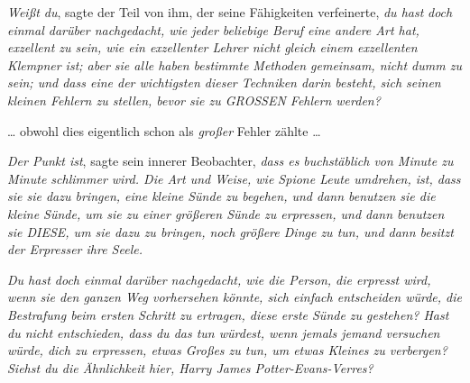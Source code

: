 \emph{Weißt du}, sagte der Teil von ihm, der seine Fähigkeiten verfeinerte, \emph{du hast} \emph{doch} \emph{einmal darüber nachgedacht, wie jeder beliebige Beruf eine andere Art hat, exzellent zu sein, wie ein exzellenter Lehrer nicht gleich einem exzellenten Klempner ist; aber sie alle haben bestimmte Methoden gemeinsam, nicht dumm zu sein; und dass eine der wichtigsten dieser Techniken darin besteht, sich seinen kleinen Fehlern zu stellen, bevor sie zu \uppercase{großen} Fehlern werden?}

… obwohl dies eigentlich schon als \emph{großer} Fehler zählte …

\emph{Der Punkt ist}, sagte sein innerer Beobachter, \emph{dass es buchstäblich von Minute zu Minute schlimmer wird. Die Art und Weise, wie Spione Leute umdrehen, ist, dass sie sie dazu bringen, eine kleine Sünde zu begehen, und dann benutzen sie die kleine Sünde, um sie zu einer größeren Sünde zu erpressen, und dann benutzen sie DIESE, um sie dazu zu bringen, noch größere Dinge zu tun, und dann besitzt der Erpresser ihre Seele.}

\emph{Du hast doch einmal darüber nachgedacht, wie die Person, die erpresst wird, wenn sie den ganzen Weg vorhersehen könnte, sich einfach entscheiden würde, die Bestrafung beim ersten Schritt zu ertragen, diese erste Sünde zu gestehen? Hast du nicht entschieden, dass du das tun würdest, wenn jemals jemand versuchen würde, dich zu erpressen, etwas Großes zu tun, um etwas Kleines zu verbergen? Siehst du die Ähnlichkeit hier, Harry James Potter-Evans-Verres?}

